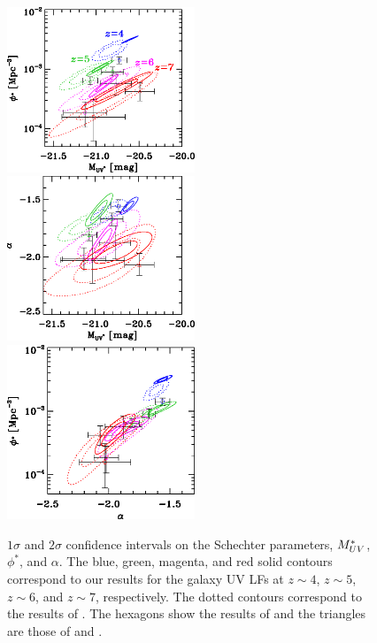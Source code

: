\documentclass[]{pasj01}
\begin{document}
\begin{figure}
 \begin{center}
  \includegraphics[width=5.6cm]{phi_M.eps} 
  \includegraphics[width=5.6cm]{alpha_M.eps} 
  \includegraphics[width=5.6cm]{phi_alpha.eps} 
 \end{center}
\caption{
$1\sigma$ and $2 \sigma$ confidence intervals on the Schechter parameters, 
$M_{\rm UV}^\ast$, $\phi^\ast$, and $\alpha$. 
The blue, green, magenta, and red solid contours correspond to 
our results for the galaxy UV LFs at $z \sim 4$, $z \sim 5$, $z \sim 6$, and $z \sim 7$, respectively. 
The dotted contours correspond to the results of \citet{2015ApJ...803...34B}. 
The hexagons show the results of \citet{2015ApJ...810...71F} 
and the triangles are those of \citet{2015MNRAS.452.1817B} and \citet{2017MNRAS.466.3612B}. 
}\label{fig:Schechter_fit}
\end{figure}
\end{document}

